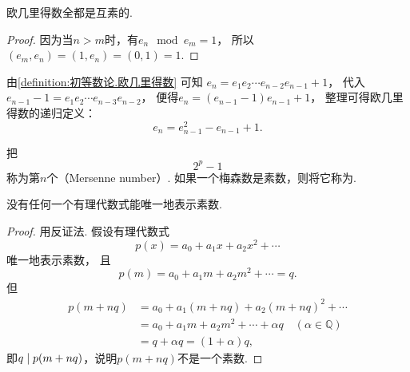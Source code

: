 \begin{proposition}
欧几里得数全都是互素的.
\begin{proof}
因为当\(n > m\)时，有\(e_n \mod e_m = 1\)，
所以\((e_m,e_n)
= (1,e_n)
= (0,1)
= 1\).
\end{proof}
\end{proposition}

由\cref{definition:初等数论.欧几里得数} 可知
\(e_n = e_1 e_2 \dotsm e_{n-2} e_{n-1} + 1\)，
代入\(e_{n-1} - 1 = e_1 e_2 \dotsm e_{n-3} e_{n-2}\)，
便得\(e_n = (e_{n-1} - 1) e_{n-1} + 1\)，
整理可得欧几里得数的递归定义：\begin{equation}
	e_n = e_{n-1}^2 - e_{n-1} + 1.
\end{equation}

\begin{definition}
把\begin{equation*}
	2^p - 1
\end{equation*}称为第\(n\)个（Mersenne number）.
如果一个梅森数是素数，则将它称为.
\end{definition}

\begin{theorem}
没有任何一个有理代数式能唯一地表示素数.
\begin{proof}
用反证法.
假设有理代数式\begin{equation*}
	p(x) = a_0 + a_1 x + a_2 x^2 + \dotsb
\end{equation*}唯一地表示素数，
且\begin{equation*}
	p(m) = a_0 + a_1 m + a_2 m^2 + \dotsb = q.
\end{equation*}
但\begin{align*}
	p(m+nq) &= a_0 + a_1 (m+nq) + a_2 (m+nq)^2 + \dotsb \\
	&= a_0 + a_1 m + a_2 m^2 + \dotsb + \alpha q \quad(\alpha\in\mathbb{Q}) \\
	&= q + \alpha q = (1+\alpha)q,
\end{align*}
即\(\truediv{p(m+nq)}{q}\)，说明\(p(m+nq)\)不是一个素数.
\end{proof}
\end{theorem}

